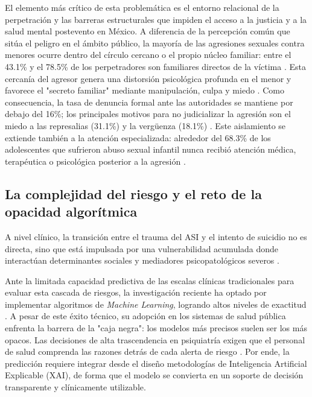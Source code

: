 El elemento más crítico de esta problemática es el entorno relacional de la perpetración y las barreras estructurales que impiden el acceso a la justicia y a la salud mental postevento en México. A diferencia de la percepción común que sitúa el peligro en el ámbito público, la mayoría de las agresiones sexuales contra menores ocurre dentro del círculo cercano o el propio núcleo familiar: entre el 43.1\% y el 78.5\% de los perpetradores son familiares directos de la víctima \cite{trends_riverarivera_2025,abuso_valdezsantiago_2020}. Esta cercanía del agresor genera una distorsión psicológica profunda en el menor y favorece el "secreto familiar" mediante manipulación, culpa y miedo \cite{trends_riverarivera_2025,abuso_valdezsantiago_2020}. Como consecuencia, la tasa de denuncia formal ante las autoridades se mantiene por debajo del 16\%; los principales motivos para no judicializar la agresión son el miedo a las represalias (31.1\%) y la vergüenza (18.1\%) \cite{abuso_valdezsantiago_2020}. Este aislamiento se extiende también a la atención especializada: alrededor del 68.3\% de los adolescentes que sufrieron abuso sexual infantil nunca recibió atención médica, terapéutica o psicológica posterior a la agresión \cite{abuso_valdezsantiago_2020}.

\subsection{La complejidad del riesgo y el reto de la opacidad algorítmica}

A nivel clínico, la transición entre el trauma del ASI y el intento de suicidio no es directa, sino que está impulsada por una vulnerabilidad acumulada donde interactúan determinantes sociales y mediadores psicopatológicos severos \cite{colburnCumulativeDeterminantsAdolescent2025, rivera-riveraPrevalenciaFactoresPsicologicos2020}. 

Ante la limitada capacidad predictiva de las escalas clínicas tradicionales para evaluar esta cascada de riesgos, la investigación reciente ha optado por implementar algoritmos de \textit{Machine Learning}, logrando altos niveles de exactitud \cite{suMachineLearningSuicide2020, walshPredictingSuicideAttempts2018}. A pesar de este éxito técnico, su adopción en los sistemas de salud pública enfrenta la barrera de la "caja negra": los modelos más precisos suelen ser los más opacos. Las decisiones de alta trascendencia en psiquiatría exigen que el personal de salud comprenda las razones detrás de cada alerta de riesgo \cite{joyceExplainableArtificialIntelligence2023}. Por ende, la predicción requiere integrar desde el diseño metodologías de Inteligencia Artificial Explicable (XAI), de forma que el modelo se convierta en un soporte de decisión transparente y clínicamente utilizable.

